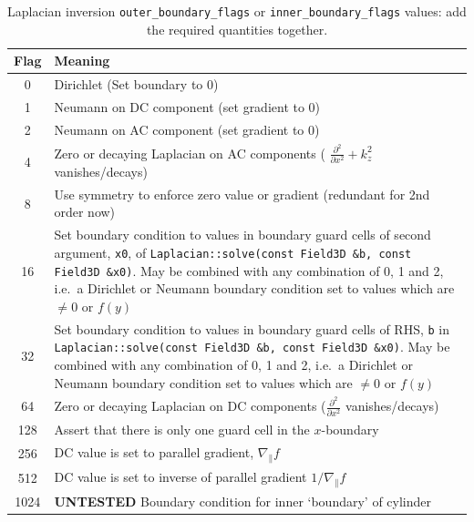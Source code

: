 \documentclass[12pt]{article}
\newcommand{\code}[1]{\texttt{#1}}
\begin{document}
\begin{table}
\caption{Laplacian inversion \code{outer\_boundary\_flags} or \code{inner\_boundary\_flags} values: add the required quantities together.}
\label{tab:laplaceBCflags}
\centering
\begin{tabular}[c]{c|p{14cm}}
\hline
Flag & Meaning \\
 &  Dirichlet (Set boundary to 0) \\
1 &  Neumann on DC component (set gradient to 0) \\
2 &  Neumann on AC component (set gradient to 0) \\
4 &  Zero or decaying Laplacian on AC components ( $\frac{\partial^2}{\partial x^2}+k_z^2$ vanishes/decays)\\
8 & Use symmetry to enforce zero value or gradient (redundant for 2nd order now) \\
16 & Set boundary condition to values in boundary guard cells of second argument, \code{x0}, of \lstinline!Laplacian::solve(const Field3D &b, const Field3D &x0)!.  May be combined with any combination of 0, 1 and 2, i.e.\ a Dirichlet or Neumann boundary condition set to values which are $\neq 0$ or $f(y)$ \\
32 & Set boundary condition to values in boundary guard cells of RHS, \code{b} in  \lstinline!Laplacian::solve(const Field3D &b, const Field3D &x0)!.  May be combined with any combination of 0, 1 and 2, i.e.\ a Dirichlet or Neumann boundary condition set to values which are $\neq 0$ or $f(y)$\\
64 & Zero or decaying Laplacian on DC components ($\frac{\partial^2}{\partial x^2}$ vanishes/decays) \\
128 &  Assert that there is only one guard cell in the
$x$-boundary \\
256 &  DC value is set to parallel gradient, $\nabla_\parallel f$ \\
512 &  DC value is set to inverse of parallel gradient $1/\nabla_\parallel f$ \\
1024 & {\color{red} \textbf{UNTESTED}} Boundary condition for inner `boundary' 
of cylinder \\
\hline
\end{tabular}
\end{table}
\end{document}
